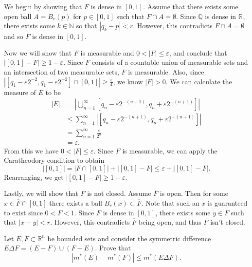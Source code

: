 \begin{solution}
  We begin by showing that $F$ is dense in $[0,1]$.
  Assume that there exists some open ball $A = B_{r}(p)$ for $p \in [0,1]$ such that $F \cap A = \emptyset$.
  Since $\mathbb{Q}$ is dense in $\mathbb{R}^{}$, there exists some $k \in \mathbb{N}$ so that $\left| q_{k} - p \right| < r$.
  However, this contradicts $F \cap A = \emptyset$ and so $F$ is dense in $[0,1]$.

  Now we will show that $F$ is measurable and $0 < \left| F \right| \leq \varepsilon$, and conclude that $\left| [0,1] - F \right| \geq 1 - \varepsilon$.
  Since $F$ consists of a countable union of measurable sets and an intersection of two measurable sets, $F$ is measurable.
  Also, since $\left| [q_{1} - \varepsilon 2^{-2}, q_{1} - \varepsilon 2^{-2}] \cap [0,1] \right| \geq \frac{\varepsilon}{4} $, we know $\left| F \right| > 0$.
  We can calculate the measure of $E$ to be
  \[
    \begin{aligned}
      |E| &= \left| \bigcup_{n=1}^{\infty}\left[q_{n} - \varepsilon 2^{-(n+1)}, q_{n} + \varepsilon 2^{-(n+1)}\right] \right| \\
          &\leq \sum_{n=1}^{\infty} \left| \left[q_{n} - \varepsilon 2^{-(n+1)}, q_{n} + \varepsilon 2^{-(n+1)}\right] \right| \\
          &= \sum_{n=1}^{\infty} \frac{\varepsilon}{2^{n}} \\
          &= \varepsilon.
    \end{aligned}
  \] 
  From this we have $0 < \left| F \right| \leq \varepsilon$.
  Since $F$ is measurable, we can apply the Caratheodory condition to obtain
  \[
    \left| [0,1] \right| = \left| F \cap [0,1] \right| + \left| [0,1] - F \right| \leq \varepsilon + \left| [0,1] - F \right|
  .\] 
  Rearranging, we get $\left| [0,1] - F \right| \geq 1 - \varepsilon$.

  Lastly, we will show that $F$ is not closed.
  Assume $\overline{F}$ is open.
  Then for some $x \in \overline{F} \cap [0,1]$ there exists a ball $B_{r}(x) \subset \overline{F}$.
  Note that such an $x$ is guaranteed to exist since $0 < F < 1$.
  Since $F$ is dense in $[0,1]$, there exists some $y \in F$ such that $\left| x - y  \right| < r$.
  However, this contradicts $\overline{F}$ being open, and thus $F$ isn't closed.

\end{solution}

\pagebreak

\begin{problem}{4}
  Let $E,F \subset \mathbb{R}^{n}$ be bounded sets and consider the symmetric difference $E \Delta F = \left( E - F \right) \cup \left( F - E \right) $.
  Prove that
  \[
    \left| m^{*}(E) - m^{*}(F) \right| \leq m^{*}(E \Delta F)
  .\] 
\end{problem}


